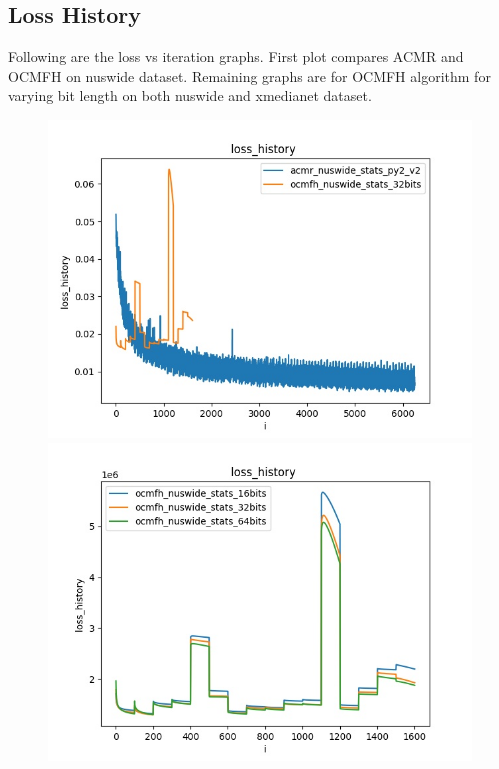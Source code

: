\subsection{Loss History}
    Following are the loss vs iteration graphs. First plot compares ACMR\cite{acmr} and OCMFH\cite{ocmfh} on nuswide dataset. Remaining graphs are for OCMFH\cite{ocmfh} algorithm for varying bit length on both nuswide and xmedianet dataset.
        \begin{figure}[H]
            \begin{minipage}[!h]{0.6\linewidth}
                \centering
                \includegraphics[width=\linewidth]{resultsImages/lossHistory/loss_history_both_nuswide.jpeg}
                \vspace{0.1ex}
                \hspace{0.1ex}
            \end{minipage}
            \begin{minipage}[!h]{0.6\linewidth}
                \centering
                \includegraphics[width=\linewidth]{resultsImages/lossHistory/loss_history_ocmfh_nuswide_bits.jpeg}

\end{minipage}
\end{figure}
